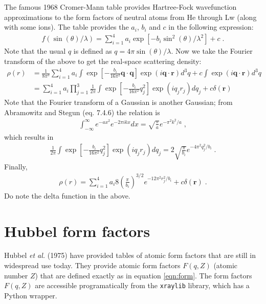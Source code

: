 \documentclass[11pt]{article}
\renewcommand{\vec}[1]{\boldsymbol{#1}}
\begin{document}
The famous 1968 Cromer-Mann \cite{Cromer1968} table provides Hartree-Fock wavefunction approximations to the 
form factors of neutral atoms from He through Lw (along with some ions).  The table provides the $a_i$, $b_i$ and $c$ in the following expression:
\begin{align}
 f(\sin(\theta)/\lambda)=\sum_{i=1}^4 a_i \exp[-b_i \sin^2(\theta)/\lambda^2] + c \;.
\end{align}
Note that the usual $q$ is defined as $q=4\pi \sin(\theta)/\lambda$.  Now we take the Fourier transform
of the above to get the real-space scattering density:
\begin{align}
 \rho(r) &= \frac{1}{8\pi^3} \sum_{i=1}^4 a_i\int   \exp\left[-\frac{b_i}{16\pi^2} \vec{q}\cdot\vec{q}\right]\exp(i\vec{q}\cdot\vec{r})d^3q + c\int \exp(i\vec{q}\cdot\vec{r}) d^3q \\
 &=  \sum_{i=1}^4 a_i \prod_{j=1}^3\frac{1}{2\pi}\int   \exp\left[-\frac{b_i}{16\pi^2} q_j^2\right]\exp(iq_jr_j)dq_j + c\delta(\vec{r})
\end{align}
Note that the Fourier transform of a Gaussian is another Gaussian; from Abramowitz and Stegun \cite{Abramowitz1972} (eq. 7.4.6) the relation is
\begin{align}
 \int_{-\infty}^\infty e^{-ax^2}e^{-2\pi i kx}dx = \sqrt{\frac{\pi}{a}}e^{-\pi^2 k^2/a} \;,
\end{align}
which results in
\begin{align}
 \frac{1}{2\pi}\int   \exp\left[-\frac{b_i}{16\pi^2} q_j^2\right]\exp(iq_jr_j)dq_j = 2\sqrt{\frac{\pi}{b_i}}e^{-4\pi^2 q_j^2/b_i} \;.
\end{align}
Finally, 
\begin{align}
 \rho(r) =  \sum_{i=1}^4 a_i 8\left(\frac{\pi}{b_i}\right)^{3/2}e^{-12\pi^2 r_j^2/b_i} + c\delta(\vec{r}) \;.
\end{align}
Do note the delta function in the above.

\section{Hubbel form factors}

Hubbel {\itshape et al.} (1975)\cite{hubbellAtomicFormFactors1975} have provided tables of atomic form factors that are
still in widespread use today.  They provide atomic form factors $F(q,Z)$ (atomic number $Z$) that are defined exactly
as in equation \ref{eqn:form}.
The form factors $F(q,Z)$ are accessible programatically from the  \texttt{xraylib} library, which has a Python wrapper.
\end{document}

